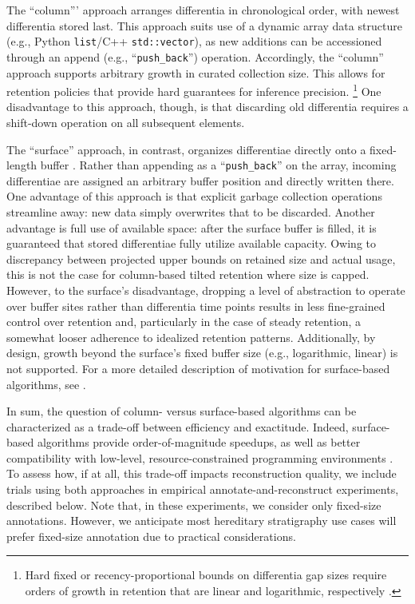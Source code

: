 The ``column''' approach arranges differentia in chronological order, with newest differentia stored last.
This approach suits use of a dynamic array data structure (e.g., Python \texttt{list}/C++ \texttt{std::vector}), as new additions can be accessioned through an append (e.g., ``\texttt{push\_back}'') operation.
Accordingly, the ``column'' approach supports arbitrary growth in curated collection size.
This allows for retention policies that provide hard guarantees for inference precision.
\footnote{%
Hard fixed or recency-proportional bounds on differentia gap sizes require orders of growth in retention that are linear and logarithmic, respectively \citep{moreno2024algorithms}.
}
One disadvantage to this approach, though, is that discarding old differentia requires a shift-down operation on all subsequent elements.

The ``surface'' approach, in contrast, organizes differentiae directly onto a fixed-length buffer \citep{moreno2024structured}.
Rather than appending as a ``\texttt{push\_back}'' on the array, incoming differentiae are assigned an arbitrary buffer position and directly written there.
One advantage of this approach is that explicit garbage collection operations streamline away: new data simply overwrites that to be discarded.
Another advantage is full use of available space: after the surface buffer is filled, it is guaranteed that stored differentiae fully utilize available capacity.
Owing to discrepancy between projected upper bounds on retained size and actual usage, this is not the case for column-based tilted retention where size is capped.
However, to the surface's disadvantage, dropping a level of abstraction to operate over buffer sites rather than differentia time points results in less fine-grained control over retention and, particularly in the case of steady retention, a somewhat looser adherence to idealized retention patterns.
Additionally, by design, growth beyond the surface's fixed buffer size (e.g., logarithmic, linear) is not supported.
For a more detailed description of motivation for surface-based algorithms, see \citep{moreno2024trackable}.

In sum, the question of column- versus surface-based algorithms can be characterized as a trade-off between efficiency and exactitude.
Indeed, surface-based algorithms provide order-of-magnitude speedups, as well as better compatibility with low-level, resource-constrained programming environments \citep{moreno2024trackable}.
To assess how, if at all, this trade-off impacts reconstruction quality, we include trials using both approaches in empirical annotate-and-reconstruct experiments, described below.
Note that, in these experiments, we consider only fixed-size annotations.
However, we anticipate most hereditary stratigraphy use cases will prefer fixed-size annotation due to practical considerations.

